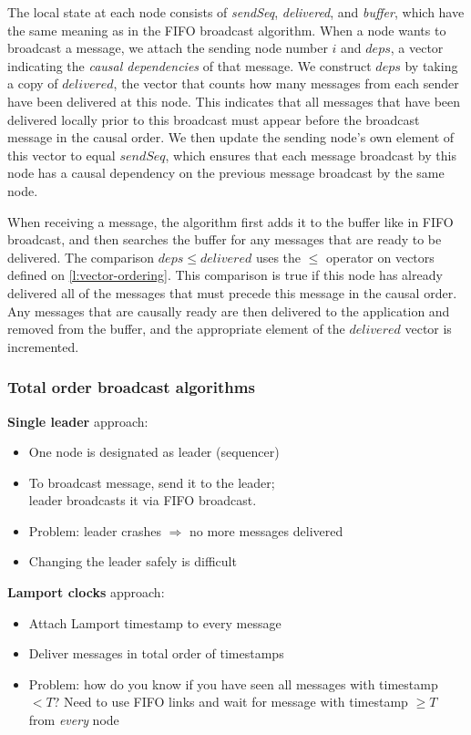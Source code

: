 The local state at each node consists of \emph{sendSeq}, \emph{delivered}, and \emph{buffer}, which have the same meaning as in the FIFO broadcast algorithm.
When a node wants to broadcast a message, we attach the sending node number $i$ and $\mathit{deps}$, a vector indicating the \emph{causal dependencies} of that message.
We construct $\mathit{deps}$ by taking a copy of $\mathit{delivered}$, the vector that counts how many messages from each sender have been delivered at this node.
This indicates that all messages that have been delivered locally prior to this broadcast must appear before the broadcast message in the causal order.
We then update the sending node's own element of this vector to equal $\mathit{sendSeq}$, which ensures that each message broadcast by this node has a causal dependency on the previous message broadcast by the same node.

When receiving a message, the algorithm first adds it to the buffer like in FIFO broadcast, and then searches the buffer for any messages that are ready to be delivered.
The comparison $\mathit{deps} \le \mathit{delivered}$ uses the $\le$ operator on vectors defined on \autoref{l:vector-ordering}.
This comparison is true if this node has already delivered all of the messages that must precede this message in the causal order.
Any messages that are causally ready are then delivered to the application and removed from the buffer, and the appropriate element of the $\mathit{delivered}$ vector is incremented.

\begin{frame}
    \label{s:total-bcast-alg}
    \frametitle{Total order broadcast algorithms}
    \textbf{Single leader} approach:
    \begin{itemize}
        \item One node is designated as leader (sequencer)
        \item To broadcast message, send it to the leader;\\ leader broadcasts it via FIFO broadcast.\pause
        \item Problem: leader crashes $\Longrightarrow$ no more messages delivered
        \item Changing the leader safely is difficult\\[1em]
    \end{itemize}\pause
    \textbf{Lamport clocks} approach:
    \begin{itemize}
        \item Attach Lamport timestamp to every message
        \item Deliver messages in total order of timestamps\pause
        \item Problem: how do you know if you have seen all messages with timestamp $< T$?
            Need to use FIFO links and wait for message with timestamp $\ge T$ from \emph{every} node
    \end{itemize}
\end{frame}
\label{l:total-bcast-alg}

